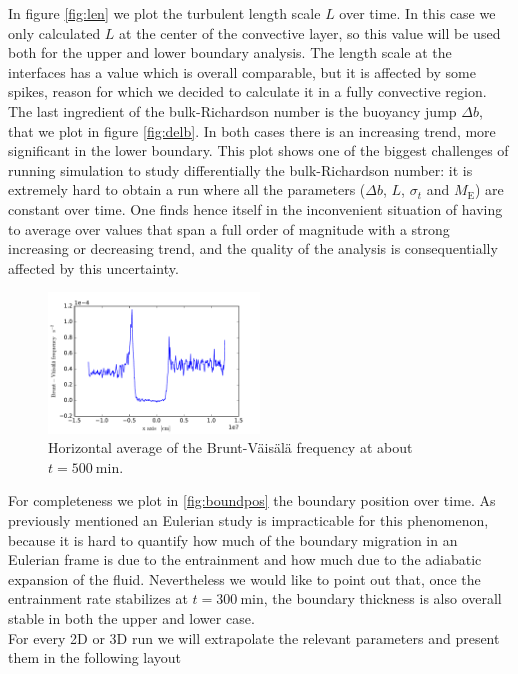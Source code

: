   In figure \ref{fig:len} we plot the turbulent length scale $L$ over time. In this case we only calculated $L$ at the center of the convective layer, so this value will be used both for the upper and lower boundary analysis. The length scale at the interfaces has a value which is overall comparable, but it is affected by some spikes, reason for which we decided to calculate it in a fully convective region.\\ 
  The last ingredient of the bulk-Richardson number is the buoyancy jump $\Delta b$, that we plot in figure \ref{fig:delb}. In both cases there is an increasing trend, more significant in the lower boundary. This plot shows one of the biggest challenges of running simulation to study differentially the bulk-Richardson number: it is extremely hard to obtain a run where all the parameters ($\Delta b$, $L$, $\sigma_t$ and $M_{\mathrm{E}}$) are constant over time. One finds hence itself in the inconvenient situation of having to average over values that span a full order of magnitude with a strong increasing or decreasing trend, and the quality of the analysis is consequentially affected by this uncertainty.\\
 \begin{figure}[t!]
\centering
\includegraphics[width=0.5\textwidth]{./img/brunt}
\caption{Horizontal average of the Brunt-Väisälä frequency at about $t=500 \ \mathrm{min}$.}
\label{fig:brunt}
\centering
\end{figure}
For completeness we plot in \ref{fig:boundpos} the boundary position over time. As previously mentioned an Eulerian study is impracticable for this phenomenon, because it is hard to quantify how much of the boundary migration in an Eulerian frame is due to the entrainment and how much due to the adiabatic expansion of the fluid. Nevertheless we would like to point out that, once the entrainment rate stabilizes at $t=300 \ \mathrm{min}$, the boundary thickness is also overall stable in both the upper and lower case. \\
For every 2D or 3D run we will extrapolate the relevant parameters and present them in the following layout
